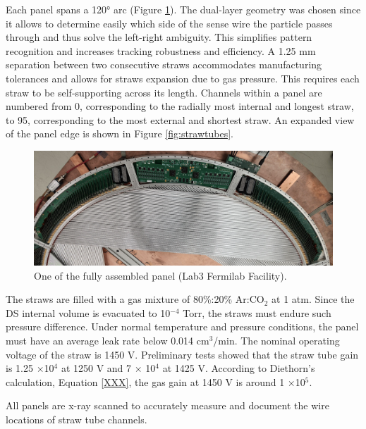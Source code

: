 Each panel spans a 120° arc (Figure \ref{fig:gonzalo}).
The dual-layer geometry was chosen since it allows to determine 
easily which side of the sense wire the particle passes through 
and thus solve the left-right ambiguity. This simplifies pattern 
recognition and increases tracking robustness and efficiency. 
A 1.25 mm separation between two consecutive straws accommodates 
manufacturing tolerances and allows for straws expansion due to gas 
pressure. This requires each straw to be self-supporting across its 
length. Channels within a panel are numbered from 0, 
corresponding to the radially most internal and longest straw, 
to 95, corresponding to the most external and shortest straw. 
An expanded view 
of the panel edge is shown in Figure \ref{fig:strawtubes}.
            \begin{figure}[!h]
                \centering
                \includegraphics[width =\textwidth]{figures/png/image.png}
                \caption[One of the fully assembled panel.]{One of the fully assembled panel (Lab3 Fermilab Facility).}
                \label{fig:gonzalo}
                \end{figure}

            The straws are filled with a gas mixture of 80\%:20\% Ar:CO$_2$ at 1 atm.
            Since the DS internal volume is evacuated to 10$^{-4}$ Torr, 
            the straws must endure such pressure difference. Under normal temperature and 
            pressure conditions, the panel must have an average leak rate below 0.014 cm$^3$/min.  
            The nominal operating voltage of the straw is 1450 V. 
            Preliminary tests showed that the straw 
            tube gain is 1.25 $\times$10$^4$ at 1250 V and 7 $\times$ 10$^4$ at 
            1425 V. According to Diethorn's calculation, Equation \ref{XXX}, 
            the gas gain at 1450 V is around 1 $\times$10$^5$.
 

All panels are x-ray scanned 
to accurately measure and document the wire 
locations of straw tube channels. 

